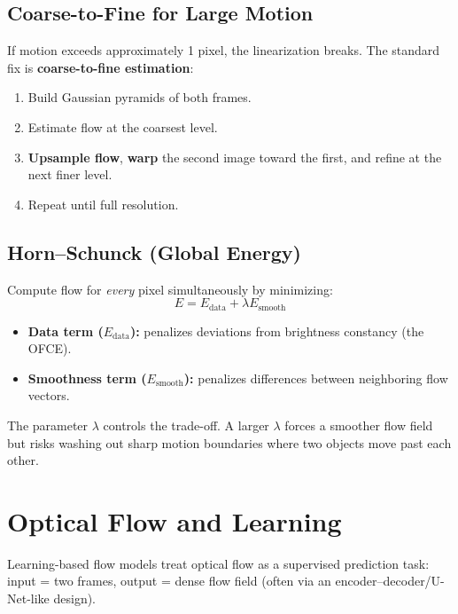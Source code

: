 \documentclass[11pt, oneside]{book}
\begin{document}
\begin{thmbox}[title={Reprojection Error Minimization}]
\begin{defbox}[title={Correlation and Convolution}]
\begin{defbox}[title={ReLU and Pooling}]
\begin{defbox}[title={Segmentation}]
\begin{defbox}[title={Graph-Based Segmentation}]
\begin{defbox}[title={U-Net}]
\subsection{Coarse-to-Fine for Large Motion}

If motion exceeds approximately 1 pixel, the linearization breaks. The standard fix is \textbf{coarse-to-fine estimation}:

\begin{enumerate}
  \item Build Gaussian pyramids of both frames.
  \item Estimate flow at the coarsest level.
  \item \textbf{Upsample flow}, \textbf{warp} the second image toward the first, and refine at the next finer level.
  \item Repeat until full resolution.
\end{enumerate}

\subsection{Horn--Schunck (Global Energy)}

\begin{thmbox}[title={Horn--Schunck Global Energy}]
Compute flow for \emph{every} pixel simultaneously by minimizing:
\[
E = E_{\text{data}} + \lambda E_{\text{smooth}}
\]
\begin{itemize}
  \item \textbf{Data term ($E_{\text{data}}$):} penalizes deviations from brightness constancy (the OFCE).
  \item \textbf{Smoothness term ($E_{\text{smooth}}$):} penalizes differences between neighboring flow vectors.
\end{itemize}
\end{thmbox}

The parameter $\lambda$ controls the trade-off. A larger $\lambda$ forces a smoother flow field but risks
washing out sharp motion boundaries where two objects move past each other.

\section{Optical Flow and Learning}

\begin{defbox}[title={Learning-Based Flow}]
Learning-based flow models treat optical flow as a supervised prediction task:
input = two frames, output = dense flow field (often via an encoder--decoder/U-Net-like design).
\end{defbox}


\end{defbox}
\end{defbox}
\end{defbox}
\end{defbox}
\end{defbox}
\end{thmbox}
\end{document}
